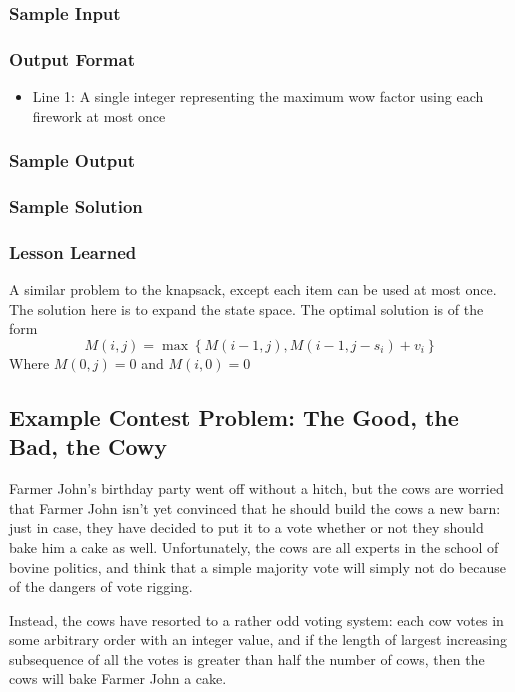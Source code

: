 \subsubsection{Sample Input}


\subsubsection{Output Format}
\begin{itemize}
	\item Line 1: A single integer representing the maximum wow factor using each firework at most once
\end{itemize}
\subsubsection{Sample Output}


\subsubsection{Sample Solution}


\subsubsection{Lesson Learned}
A similar problem to the knapsack, except each item can be used at most once.  The solution here is to expand the state space.  The optimal solution is of the form
$$M(i,j) = \max \left\{ M(i-1, j) , M(i-1, j- s_i) + v_i \right\}$$
Where $M(0,j) = 0$ and $M(i,0) = 0$

\subsection{Example Contest Problem: The Good, the Bad, the Cowy}
Farmer John's birthday party went off without a hitch, but the cows are worried that Farmer John isn't yet convinced that he should build the cows a new barn: just in case, they have decided to put it to a vote whether or not they should bake him a cake as well.
Unfortunately, the cows are all experts in the school of bovine politics, and think that a simple majority vote will simply not do because of the dangers of vote rigging.

Instead, the cows have resorted to a rather odd voting system: each cow votes in some arbitrary order with an integer value, and if the length of largest increasing subsequence of all the votes is greater than half the number of cows, then the cows will bake Farmer John a cake.

